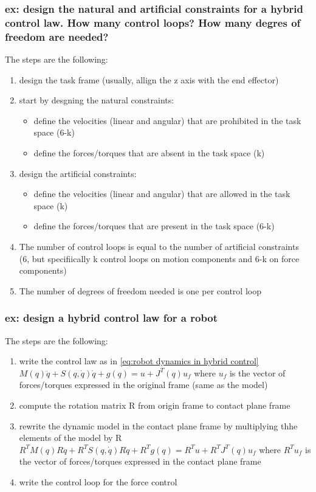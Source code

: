 \documentclass[a4paper,12pt]{article}
\begin{document}
\subsubsection{ex: design the natural and 
artificial constraints for a hybrid control law. How many control loops?
How many degres of freedom are needed?}
The steps are the following:
\begin{enumerate}
\item design the task frame (usually, allign the z 
axis with the end effector)
\item start by desgning the natural constraints: \begin{itemize}
    \item define the velocities (linear and angular) that are
        prohibited in the task space (6-k)
    \item define the forces/torques that are absent
     in the task space (k)
\end{itemize}
\item design the artificial constraints: \begin{itemize}
    \item define the velocities (linear and angular) that are
        allowed in the task space (k)
    \item define the forces/torques that are present
     in the task space (6-k)
\end{itemize}
\item The number of control loops is equal to the number of
artificial constraints (6, but specifiically k 
control loops on motion components and 6-k on force components)
\item The number of degrees of freedom needed is one per 
control loop
\end{enumerate}

\subsubsection{ex: design a hybrid control law for a robot}
The steps are the following:
\begin{enumerate}
    \item write the control law as in \ref{eq:robot dynamics in hybrid control}
    $M(q)\ddot{q}+S(q,\dot{q})\dot{q}+g(q)=u+J^T(q)u_f$
    where $u_f$ is the vector of forces/torques expressed 
    in the original frame (same as the model)
    \item compute the rotation matrix R from origin frame
     to contact plane 
    frame 
    \item rewrite the dynamic model in the contact plane frame
    by multiplying thhe elements of the model by R
    $R^TM(q)R\ddot{q}+R^TS(q,\dot{q})R\dot{q}+R^Tg(q)=R^Tu + R^TJ^T(q)u_f$
    where $R^T u_f$ is the vector of forces/torques
     expressed in the contact plane frame
    \item write the control loop for the force control
\end{enumerate}
\end{document}
